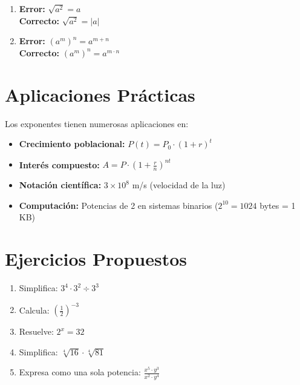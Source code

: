 \begin{teoria}
\begin{enumerate}
\item \textbf{Error:} $\sqrt{a^2} = a$\\
\textbf{Correcto:} $\sqrt{a^2} = |a|$

\item \textbf{Error:} $(a^m)^n = a^{m+n}$\\
\textbf{Correcto:} $(a^m)^n = a^{m \cdot n}$
\end{enumerate}


\section{Aplicaciones Prácticas}

Los exponentes tienen numerosas aplicaciones en:

\begin{itemize}
\item \textbf{Crecimiento poblacional:} $P(t) = P_0 \cdot (1+r)^t$
\item \textbf{Interés compuesto:} $A = P \cdot (1+\frac{r}{n})^{nt}$
\item \textbf{Notación científica:} $3 \times 10^8$ m/s (velocidad de la luz)
\item \textbf{Computación:} Potencias de 2 en sistemas binarios ($2^{10} = 1024$ bytes = 1 KB)
\end{itemize}


\section{Ejercicios Propuestos}

\begin{enumerate}
\item Simplifica: $3^4 \cdot 3^2 \div 3^3$
\item Calcula: $\left(\frac{1}{2}\right)^{-3}$
\item Resuelve: $2^x = 32$
\item Simplifica: $\sqrt[4]{16} \cdot \sqrt[4]{81}$
\item Expresa como una sola potencia: $\frac{x^5 \cdot y^3}{x^2 \cdot y^4}$
\end{enumerate}



\end{teoria}
